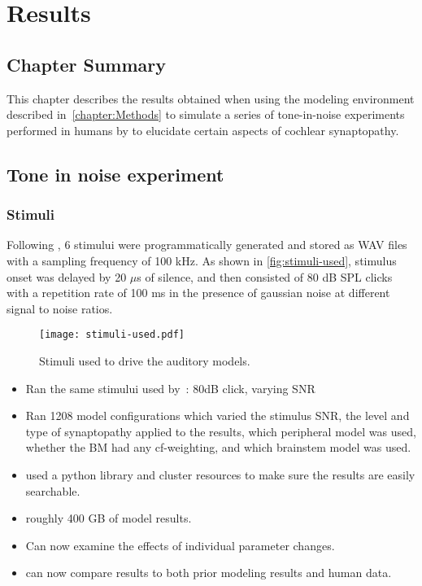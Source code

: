 \chapter{Results}
\label{chapter:Results}
\thispagestyle{myheadings}

\graphicspath{{5_Results/Figures/}}
\section{Chapter Summary} %
\label{sec:results_summary}
This chapter describes the results obtained when using the modeling environment described in~\autoref{chapter:Methods} to simulate a series of tone-in-noise experiments performed in humans by \citeauthor{Mehraei2016Auditory} to elucidate certain aspects of cochlear synaptopathy. 

\section{Tone in noise experiment} %
\label{sec:tone_in_noise}

\subsection{Stimuli} %
\label{sub:stimuli}
Following \citeauthor{Mehraei2015Auditory,Mehraei2016Auditory}, 6 stimului were programmatically generated and stored as WAV files with a sampling frequency of 100 kHz.  As shown in \autoref{fig:stimuli-used}, stimulus onset was delayed by 20 $\mu$s of silence, and then consisted of 80 dB SPL clicks with a repetition rate of 100 ms in the presence of gaussian noise at different signal to noise ratios. 

\begin{figure}[htbp]
	\centering
	\texttt{[image: stimuli-used.pdf]}
	\caption[Experimental Stimuli]{Stimuli used to drive the auditory models.}
	\label{fig:stimuli-used}
\end{figure}

\begin{itemize}
	\item Ran the same stimului used by~\cite{Mehraei2015Auditory}: 80dB click, varying SNR
	\item Ran 1208 model configurations which varied  the stimulus SNR, the level and type of synaptopathy applied to the results, which peripheral model was used, whether the BM had any cf-weighting, and which brainstem model was used. 
	\item used a python library and cluster resources to make sure the results are easily searchable. 
	\item roughly 400 GB of model results.
	\item Can now examine the effects of individual parameter changes. 
	\item can now compare results to both prior modeling results and human data. 
\end{itemize}


